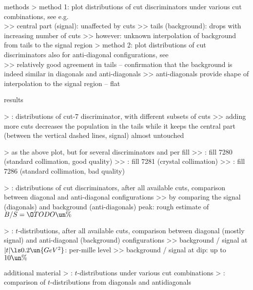 \> methods
\>> method 1: plot distributions of cut discriminators under various cut combinations, see e.g.\\ 
\>>> central part (signal): unaffected by cuts
\>>> tails (background): drops with increasing number of cuts
\>>> however: unknown interpolation of background from tails to the signal region
\>> method 2: plot distributions of cut discriminators also for anti-diagonal configurations, see\\ 
\>>> relatively good agreement in tails -- confirmation that the background is indeed similar in diagonals and anti-diagonals
\>>> anti-diagonals provide shape of interpolation to the signal region -- flat

\> results

\>> : distributions of cut-7 discriminator, with different subsets of cuts
\>>> adding more cuts decreases the population in the tails while it keeps the central part (between the vertical dashed lines, signal) almost untouched

\>> as the above plot, but for several discriminators and per fill
\>>> : fill 7280 (standard collimation, good quality)
\>>> : fill 7281 (crystal collimation)
\>>> : fill 7286 (standard collimation, bad quality)

\>> : distributions of cut discriminators, after all available cuts, comparison between diagonal and anti-diagonal configurations
\>>> by comparing the signal (diagonals) and background (anti-diagonals) peak: rough estimate of $B/S = \O{TODO\un{\%}}$

\>> : $t$-distributions, after all available cuts, comparison between diagonal (mostly signal) and anti-diagonal (background) configurations
\>>> background / signal at $|t| \ls 0.2\un{GeV^2}$: per-mille level
\>>> background / signal at dip: up to $10\un{\%}$


\> additional material
\>> : $t$-distributions under various cut combinations
\>> : comparison of $t$-distributions from diagonals and antidiagonals



